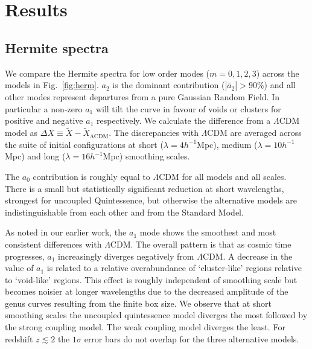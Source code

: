 \documentclass[a4paper,fleqn,usenatbib]{mnras}
\begin{document}


\section{Results}
\label{sec:results}


\subsection{Hermite spectra}
\label{subsec:hermspec}

We compare the Hermite spectra for low order modes ($m=0,1,2,3$) across the models in Fig.~\ref{fig:herm}. $a_2$ is the dominant contribution ($|\tilde{a_2}|>90\%$) and all other modes represent departures from a pure Gaussian Random Field. In particular a non-zero $a_1$ will tilt the curve in favour of voids or clusters for positive and negative $a_1$ respectively. We calculate the difference from a $\Lambda$CDM model as $\Delta X \equiv \tilde{X} - \tilde{X}_{\mathrm{\Lambda CDM}}$. The discrepancies with $\Lambda$CDM are averaged across the suite of initial configurations at short ($\lambda = 4 h^{-1}$Mpc), medium ($\lambda = 10 h^{-1}$Mpc) and long ($\lambda = 16 h^{-1}$Mpc) smoothing scales.  

The $a_0$ contribution is roughly equal to $\Lambda$CDM for all models and all scales. There is a small but statistically significant reduction at short wavelengths, strongest for uncoupled Quintessence, but otherwise the alternative models are indistinguishable from each other and from the Standard Model.

As noted in our earlier work, the $a_1$ mode shows the smoothest and most consistent differences with $\Lambda$CDM. The overall pattern is that as cosmic time progresses, $a_1$ increasingly diverges negatively from $\Lambda$CDM. A decrease in the value of $a_1$ is related to a relative overabundance of `cluster-like' regions relative to `void-like' regions. This effect is roughly independent of smoothing scale but becomes noisier at longer wavelengths due to the decreased amplitude of the genus curves resulting from the finite box size. We observe that at short smoothing scales the uncoupled quintessence model diverges the most followed by the strong coupling model. The weak coupling model diverges the least. For redshift $z \lesssim 2$ the $1\sigma$ error bars do not overlap for the three alternative models.
\end{document}
